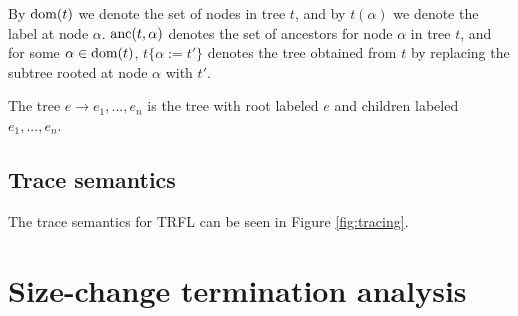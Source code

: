 \documentclass[10pt]{../sigplanconf}
\newcommand{\dom}{\ensuremath{{\rm dom}}}
\begin{document}
By $\dom(t)$ we denote the set of nodes in tree $t$, and by
$t(\alpha)$ we denote the label at node $\alpha$. ${\rm anc}(t,
\alpha)$ denotes the set of ancestors for node $\alpha$ in tree $t$,
and for some $\alpha \in \dom(t)$, $t\{\alpha := t'\}$ denotes the
tree obtained from $t$ by replacing the subtree rooted at node
$\alpha$ with $t'$.

The tree $e \rightarrow e_1, ..., e_n$ is the tree with root labeled
$e$ and children labeled $e_1, ..., e_n$.

\subsection{Trace semantics}
The trace semantics for TRFL can be seen in Figure \ref{fig:tracing}.

\section{Size-change termination analysis}
\end{document}
